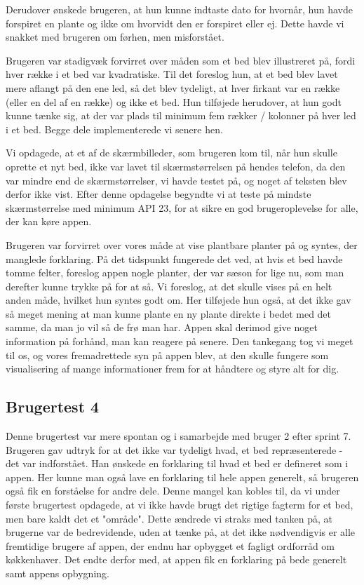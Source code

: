 Derudover ønskede brugeren, at hun kunne indtaste dato for hvornår, hun havde forspiret en plante og ikke om hvorvidt den er forspiret eller ej. Dette havde vi snakket med brugeren om førhen, men misforstået.

Brugeren var stadigvæk forvirret over måden som et bed blev illustreret på, fordi hver række i et bed var kvadratiske. Til det foreslog hun, at et bed blev lavet mere aflangt på den ene led, så det blev tydeligt, at hver firkant var en række (eller en del af en række) og ikke et bed. Hun tilføjede herudover, at hun godt kunne tænke sig, at der var plads til minimum fem rækker / kolonner på hver led i et bed. Begge dele implementerede vi senere hen.

Vi opdagede, at et af de skærmbilleder, som brugeren kom til, når hun skulle oprette et nyt bed, ikke var lavet til skærmstørrelsen på hendes telefon, da den var mindre end de skærmstørrelser, vi havde testet på, og noget af teksten blev derfor ikke vist. Efter denne opdagelse begyndte vi at teste på mindste skærmstørrelse med minimum API 23, for at sikre en god brugeroplevelse for alle, der kan køre appen.

Brugeren var forvirret over vores måde at vise plantbare planter på og syntes, der manglede forklaring. På det tidspunkt fungerede det ved, at hvis et bed havde tomme felter, foreslog appen nogle planter, der var sæson for lige nu, som man derefter kunne trykke på for at så. Vi foreslog, at det skulle vises på en helt anden måde, hvilket hun syntes godt om. Her tilføjede hun også, at det ikke gav så meget mening at man kunne plante en ny plante direkte i bedet med det samme, da man jo vil så de frø man har. Appen skal derimod give noget information på forhånd, man kan reagere på senere. Den tankegang tog vi meget til os, og vores fremadrettede syn på appen blev, at den skulle fungere som visualisering af mange informationer frem for at håndtere og styre alt for dig.

\subsection{Brugertest 4}

Denne brugertest var mere spontan og i samarbejde med bruger 2 efter sprint 7. Brugeren gav udtryk for at det ikke var tydeligt hvad, et bed repræsenterede - det var indforstået. Han ønskede en forklaring til hvad et bed er defineret som i appen. Her kunne man også lave en forklaring til hele appen generelt, så brugeren også fik en forståelse for andre dele. Denne mangel kan kobles til, da vi under første brugertest opdagede, at vi ikke havde brugt det rigtige fagterm for et bed, men bare kaldt det et "område". Dette ændrede vi straks med tanken på, at brugerne var de bedrevidende, uden at tænke på, at det ikke nødvendigvis er alle fremtidige brugere af appen, der endnu har opbygget et fagligt ordforråd om køkkenhaver. Det endte derfor med, at appen fik en forklaring på bede generelt samt appens opbygning.

